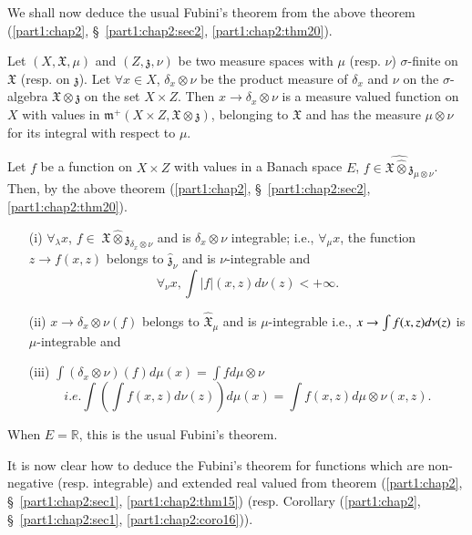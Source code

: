 We shall now deduce the usual Fubini's theorem from the above theorem
(\ref{part1:chap2}, \S\ \ref{part1:chap2:sec2}, \ref{part1:chap2:thm20}).

Let $(X, \mathfrak{X}, \mu)$  and $(Z, \mathfrak{z}, \nu)$ be two
measure spaces with $\mu$ (resp. $\nu$) $\sigma$-finite on
$\mathfrak{X}$ (resp. on $\mathfrak{z}$). Let $\forall x \in X$,
$\delta_x \otimes \nu$ be the product measure of $\delta_x$ and $\nu$
on the $\sigma$-algebra $\mathfrak{X} \otimes \mathfrak{z}$ on the set
$X \times Z$. Then $x \to \delta_x\otimes \nu$ is a measure valued
function on $X$ with values in $\mathfrak{m}^+ (X \times Z,
\mathfrak{X}\otimes \mathfrak{z})$, belonging to $\mathfrak{X}$ and
has the measure $\mu \otimes \nu$ for its integral with respect to
$\mu$.

Let $f$ be a function on $X \times Z$ with values in a Banach space
$E$, $f \in \widehat{\mathfrak{X} \hat{\otimes} \mathfrak{z}}_{\mu \otimes
  \nu}$. Then, by the above theorem (\ref{part1:chap2},
\S\ \ref{part1:chap2:sec2}, \ref{part1:chap2:thm20}).  
\begin{itemize}
\item[{\rm (i)}] $\forall_\lambda x$, $f \in \; \mathfrak{X}
  \hat{\otimes} \mathfrak{z}_{\delta_x \otimes \nu}$ and is $\delta_x
  \otimes \nu$ integrable; i.e., $\forall_\mu x$, the function $z \to
  f (x, z)$ belongs to $\hat{\mathfrak{z}}_\nu$ and is
  $\nu$-integrable and 
$$
\forall_\nu x, \int |f| (x, z) d \nu (z) < + \infty. 
$$

\item[{\rm (ii)}] $x \to \delta_x \otimes \nu(f)$ belongs to
  $\hat{\mathfrak{X}}_\mu$ and is $\mu$-integrable i.e., $x \to \int f
  (x, z)\break d \nu(z)$ is $\mu$-integrable and 

\item[{\rm (iii)}] \qquad $\int (\delta_x \otimes \nu) (f) d\mu (x) =
  \int f d \mu \otimes \nu$ 
$$
i.e. \int (\int f(x, z) d\nu (z)) d\mu (x) = \int f(x, z) d\mu \otimes
\nu (x,z). 
$$
\end{itemize}

When $E= \mathbb{R}$, this is the usual Fubini's theorem.

It is now clear how to deduce the Fubini's theorem for functions which
are non-negative (resp. integrable) and extended real valued from
theorem (\ref{part1:chap2}, \S\ \ref{part1:chap2:sec1},
\ref{part1:chap2:thm15}) (resp. Corollary (\ref{part1:chap2},
\S\ \ref{part1:chap2:sec1}, \ref{part1:chap2:coro16})).   


